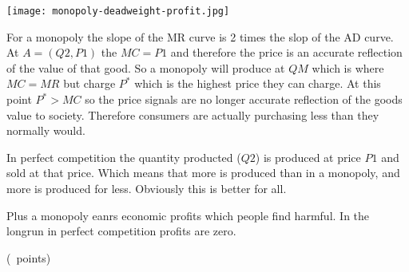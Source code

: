 \begin{questions}
\begin{solution}
    \texttt{[image: monopoly-deadweight-profit.jpg]}

    For a monopoly the slope of the MR curve is 2 times the slop of
    the AD curve. At $A = (Q2, P1)$ the $MC = P1$ and therefore the
    price is an accurate reflection of the value of that good.  So a
    monopoly will produce at $QM$ which is where $MC = MR$ but charge
    $P^*$ which is the highest price they can charge. At this point
    $P^* > MC$ so the price signals are no longer accurate reflection
    of the goods value to society. Therefore consumers are actually
    purchasing less than they normally would.

    In perfect competition the quantity producted ($Q2$) is produced
    at price $P1$ and sold at that price. Which means that more is
    produced than in a monopoly, and more is produced for
    less. Obviously this is better for all. 

    Plus a monopoly eanrs economic profits which people find
    harmful. In the longrun in perfect competition profits are zero.
    
  \end{solution}

  \question (\totalpoints\ points) 
\end{questions}
